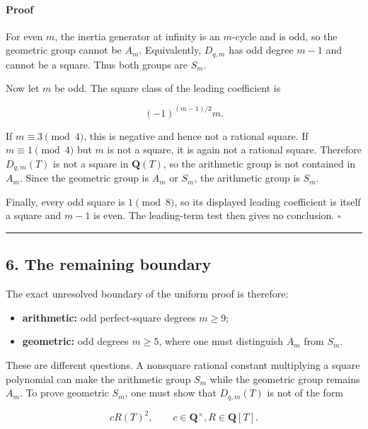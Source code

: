 \paragraph{Proof}

For even \(m\), the inertia generator at infinity is an \(m\)-cycle and is
odd, so the geometric group cannot be \(A_m\). Equivalently,
\(D_{q,m}\) has odd degree \(m-1\) and cannot be a square. Thus both groups
are \(S_m\).

Now let \(m\) be odd. The square class of the leading coefficient is

\[
 (-1)^{(m-1)/2}m.
\]

If \(m\equiv3\pmod4\), this is negative and hence not a rational square. If
\(m\equiv1\pmod4\) but \(m\) is not a square, it is again not a rational
square. Therefore \(D_{q,m}(T)\) is not a square in \(\mathbf Q(T)\), so
the arithmetic group is not contained in \(A_m\). Since the geometric group
is \(A_m\) or \(S_m\), the arithmetic group is \(S_m\).

Finally, every odd square is \(1\pmod8\), so its displayed leading
coefficient is itself a square and \(m-1\) is even. The leading-term test
then gives no conclusion. \(\square\)

\begin{center}\rule{0.5\linewidth}{0.5pt}\end{center}

\subsection{6. The remaining boundary}

The exact unresolved boundary of the uniform proof is therefore:

\begin{itemize}
\tightlist
\item
  \textbf{arithmetic:} odd perfect-square degrees \(m\ge9\);
\item
  \textbf{geometric:} odd degrees \(m\ge5\), where one must distinguish \(A_m\)
  from \(S_m\).
\end{itemize}

These are different questions. A nonsquare rational constant multiplying a
square polynomial can make the arithmetic group \(S_m\) while the geometric
group remains \(A_m\). To prove geometric \(S_m\), one must show that
\(D_{q,m}(T)\) is not of the form

\[
 cR(T)^2,
 \qquad c\in\mathbf Q^\times, R\in\mathbf Q[T].
\]

